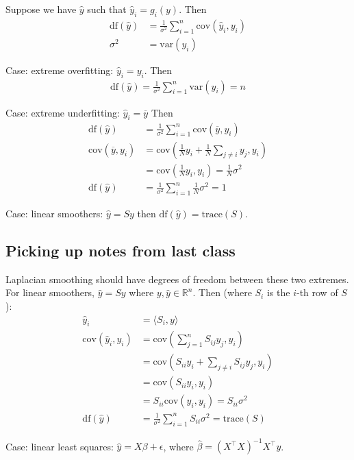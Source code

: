 \documentclass{article}
\newcommand{\obar}[1]{\ensuremath{\overline{ #1 }}}
\begin{document}
Suppose we have $\hat{y}$ such that $\hat{y}_i=g_i(y)$. Then
\begin{align*}
\textrm{df}(\hat{y}) &= \frac{1}{\sigma^2} \sum_{i=1}^n \textrm{cov}(\hat{y}_i, y_i)\\
\sigma^2&=\textrm{var}(y_i)
\end{align*}

Case: extreme overfitting: $\hat{y}_i=y_i$. Then
\begin{align*}
\textrm{df}(\hat{y}) = \frac{1}{\sigma^2}\sum_{i=1}^n \textrm{var}(y_i)=n
\end{align*}

Case: extreme underfitting: $\hat{y}_i=\obar{y}$ Then
\begin{align*}
\textrm{df}(\hat{y}) &= \frac{1}{\sigma^2}\sum_{i=1}^n \textrm{cov}(\obar{y}, y_i)\\
\textrm{cov}(\obar{y}, y_i)  &=  \textrm{cov}\left( \frac{1}{N}y_i + \frac{1}{N}\sum_{j\neq i}y_j, y_i \right)\\
&=\textrm{cov}\left(\frac{1}{N} y_i, y_i\right)=\frac{1}{N}\sigma^2\\
\textrm{df}(\hat{y})&=\frac{1}{\sigma^2}\sum_{i=1}^n \frac{1}{N}\sigma^2 = 1
\end{align*}

Case: linear smoothers: $\hat{y}=Sy$ then $\textrm{df}(\hat{y}) = \textrm{trace}(S)$.

\subsection{Picking up notes from last class}
Laplacian smoothing should have degrees of freedom between these two extremes.
For linear smoothers, $\hat{y}=Sy$ where $y,\hat{y}\in\mathbb{R}^n$. Then (where $S_i$ is the $i$-th row of $S$):
\begin{align*}
\hat{y}_i&=\langle S_i, y \rangle\\
\textrm{cov}(\hat{y}_i, y_i)&=\textrm{cov}\left( \sum_{j=1}^n S_{ij}y_j, y_i  \right)\\
&=\textrm{cov}\left( S_{ii}y_i + \sum_{j\neq i} S_{ij}y_j, y_i  \right)\\
&=\textrm{cov}\left( S_{ii}y_i, y_i  \right)\\
&=S_{ii}\textrm{cov}(y_i, y_i)=S_{ii} \sigma^2\\
\textrm{df}(\hat{y})&=\frac{1}{\sigma^2}\sum_{i=1}^n S_{ii}\sigma^2 =\textrm{trace}(S)
\end{align*}

Case: linear least squares: $\hat{y}=X\beta+\epsilon$, where $\hat{\beta}=(X^\top X)^{-1}X^\top y$.
\end{document}

